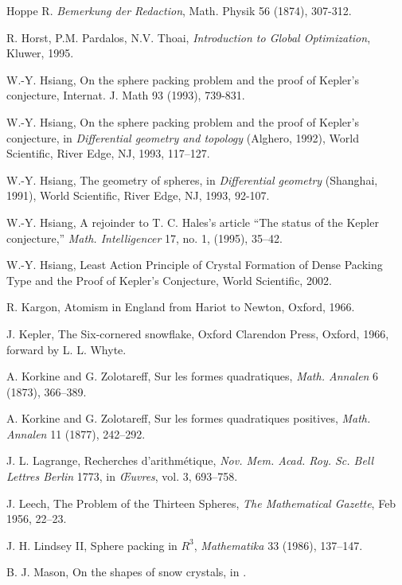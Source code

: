  Hoppe R. {\it Bemerkung der Redaction}, Math. Physik 56
(1874), 307-312.

 R. Horst, P.M. Pardalos, N.V. Thoai, {\it Introduction
    to Global Optimization}, Kluwer, 1995.

 W.-Y. Hsiang, On the sphere packing problem and the proof
    of Kepler's conjecture, Internat. J. Math 93 (1993), 739-831.

 W.-Y. Hsiang, On the sphere packing problem and the
    proof of Kepler's conjecture, in {\it Differential geometry and
    topology} (Alghero, 1992), World Scientific, River Edge,
    NJ, 1993,  117--127.

 W.-Y. Hsiang, The geometry of spheres, in {\it Differential
    geometry} (Shanghai, 1991), World Scientific, River Edge, NJ,
    1993, 92-107.

 W.-Y. Hsiang, A rejoinder to T. C. Hales's article ``The status
    of the Kepler conjecture,'' {\it Math. Intelligencer} 17, no. 1, (1995),
    35--42.

 W.-Y. Hsiang, Least Action Principle of Crystal Formation
of Dense Packing Type and the Proof of Kepler's Conjecture, World
Scientific, 2002.

 R. Kargon, Atomism in England from Hariot to Newton,
    Oxford, 1966.

 J. Kepler, The Six-cornered snowflake, Oxford Clarendon Press,
    Oxford, 1966,  forward by L. L. Whyte.

 A. Korkine and  G. Zolotareff, Sur les formes quadratiques,
    {\it Math. Annalen} 6 (1873), 366--389.

 A. Korkine and  G. Zolotareff, Sur les formes quadratiques
    positives, {\it Math. Annalen} 11 (1877), 242--292.

 J. L. Lagrange,  Recherches d'arithm\'etique, {\it Nov. Mem.
    Acad. Roy. Sc. Bell Lettres Berlin} 1773, in {\it \OE uvres}, vol. 3,
    693--758.

 J. Leech, The Problem of the Thirteen Spheres,
{\it The Mathematical Gazette}, Feb 1956, 22--23.

 J. H. Lindsey II, Sphere packing in $R^3$, {\it Mathematika}
    33 (1986), 137--147.

 B. J. Mason, On the shapes of snow crystals, in \cite{Kep66}.

